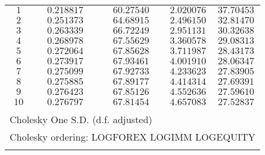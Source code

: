 \begin{tabular}{lrrrr}
\multicolumn{1}{c}{$1$}&\multicolumn{1}{c}{$0.218817$}&\multicolumn{1}{c}{$60.27540$}&\multicolumn{1}{c}{$2.020076$}&\multicolumn{1}{c}{$37.70453$}\\
\multicolumn{1}{c}{$2$}&\multicolumn{1}{c}{$0.251373$}&\multicolumn{1}{c}{$64.68915$}&\multicolumn{1}{c}{$2.496150$}&\multicolumn{1}{c}{$32.81470$}\\
\multicolumn{1}{c}{$3$}&\multicolumn{1}{c}{$0.263339$}&\multicolumn{1}{c}{$66.72249$}&\multicolumn{1}{c}{$2.951131$}&\multicolumn{1}{c}{$30.32638$}\\
\multicolumn{1}{c}{$4$}&\multicolumn{1}{c}{$0.268978$}&\multicolumn{1}{c}{$67.55629$}&\multicolumn{1}{c}{$3.360578$}&\multicolumn{1}{c}{$29.08313$}\\
\multicolumn{1}{c}{$5$}&\multicolumn{1}{c}{$0.272064$}&\multicolumn{1}{c}{$67.85628$}&\multicolumn{1}{c}{$3.711987$}&\multicolumn{1}{c}{$28.43173$}\\
\multicolumn{1}{c}{$6$}&\multicolumn{1}{c}{$0.273917$}&\multicolumn{1}{c}{$67.93461$}&\multicolumn{1}{c}{$4.001910$}&\multicolumn{1}{c}{$28.06347$}\\
\multicolumn{1}{c}{$7$}&\multicolumn{1}{c}{$0.275099$}&\multicolumn{1}{c}{$67.92733$}&\multicolumn{1}{c}{$4.233623$}&\multicolumn{1}{c}{$27.83905$}\\
\multicolumn{1}{c}{$8$}&\multicolumn{1}{c}{$0.275885$}&\multicolumn{1}{c}{$67.89177$}&\multicolumn{1}{c}{$4.414314$}&\multicolumn{1}{c}{$27.69391$}\\
\multicolumn{1}{c}{$9$}&\multicolumn{1}{c}{$0.276423$}&\multicolumn{1}{c}{$67.85126$}&\multicolumn{1}{c}{$4.552636$}&\multicolumn{1}{c}{$27.59610$}\\
\multicolumn{1}{c}{$10$}&\multicolumn{1}{c}{$0.276797$}&\multicolumn{1}{c}{$67.81454$}&\multicolumn{1}{c}{$4.657083$}&\multicolumn{1}{c}{$27.52837$}\\
[4.5pt] \hline \\ [-4.5pt]
\multicolumn{3}{l}{Cholesky One S.D. (d.f. adjusted)}&\multicolumn{1}{c}{}&\multicolumn{1}{c}{}\\
\multicolumn{5}{l}{Cholesky ordering:  LOGFOREX LOGIMM LOGEQUITY}\\
[4.5pt] \hline \\ [-4.5pt]
\end{tabular}